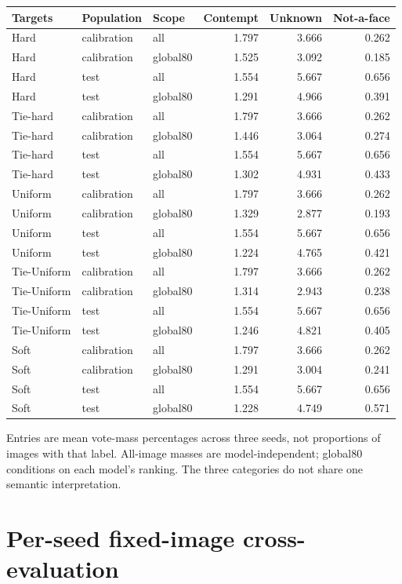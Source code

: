 \documentclass[10pt]{article}
\begin{document}
\begin{longtable}{lllrrr}\toprule Targets & Population & Scope & Contempt & Unknown & Not-a-face\\\midrule\endhead
Hard & calibration & all & 1.797 & 3.666 & 0.262\\
Hard & calibration & global80 & 1.525 & 3.092 & 0.185\\
Hard & test & all & 1.554 & 5.667 & 0.656\\
Hard & test & global80 & 1.291 & 4.966 & 0.391\\
Tie-hard & calibration & all & 1.797 & 3.666 & 0.262\\
Tie-hard & calibration & global80 & 1.446 & 3.064 & 0.274\\
Tie-hard & test & all & 1.554 & 5.667 & 0.656\\
Tie-hard & test & global80 & 1.302 & 4.931 & 0.433\\
Uniform & calibration & all & 1.797 & 3.666 & 0.262\\
Uniform & calibration & global80 & 1.329 & 2.877 & 0.193\\
Uniform & test & all & 1.554 & 5.667 & 0.656\\
Uniform & test & global80 & 1.224 & 4.765 & 0.421\\
Tie-Uniform & calibration & all & 1.797 & 3.666 & 0.262\\
Tie-Uniform & calibration & global80 & 1.314 & 2.943 & 0.238\\
Tie-Uniform & test & all & 1.554 & 5.667 & 0.656\\
Tie-Uniform & test & global80 & 1.246 & 4.821 & 0.405\\
Soft & calibration & all & 1.797 & 3.666 & 0.262\\
Soft & calibration & global80 & 1.291 & 3.004 & 0.241\\
Soft & test & all & 1.554 & 5.667 & 0.656\\
Soft & test & global80 & 1.228 & 4.749 & 0.571\\
\bottomrule\end{longtable}
Entries are mean vote-mass percentages across three seeds, not proportions of images with that label. All-image masses are model-independent; global80 conditions on each model's ranking. The three categories do not share one semantic interpretation.


\clearpage\section*{Per-seed fixed-image cross-evaluation}
\end{document}
